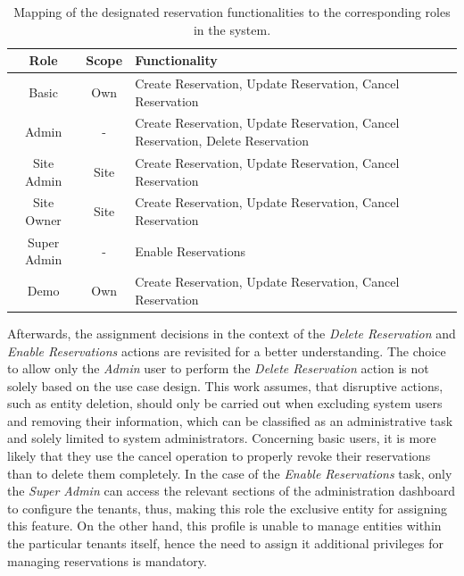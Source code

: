 \begingroup
\setlength{\tabcolsep}{10pt} %
\renewcommand{\arraystretch}{1.5} %
\begin{table}[h]
    \centering
    \caption{Mapping of the designated reservation functionalities to the corresponding roles in the system.}
    \begin{tabular}{c|c|m{9.5cm}}
        Role & Scope & Functionality \\
        \hline
        Basic & Own & Create Reservation, Update Reservation, Cancel Reservation \\
        Admin & - & Create Reservation, Update Reservation, Cancel Reservation, Delete Reservation \\
        Site Admin & Site & Create Reservation, Update Reservation, Cancel Reservation \\
        Site Owner & Site & Create Reservation, Update Reservation, Cancel Reservation \\
        Super Admin & - & Enable Reservations \\
        Demo & Own & Create Reservation, Update Reservation, Cancel Reservation \\
    \end{tabular}
    \label{tab:role-function-mapping}
\end{table}
\endgroup

\noindent Afterwards, the assignment decisions in the context of the \textit{Delete Reservation} and \textit{Enable Reservations} actions are revisited for a better understanding. The choice to allow only the \textit{Admin} user to perform the \textit{Delete Reservation} action is not solely based on the use case design.
This work assumes, that disruptive actions, such as entity deletion, should only be carried out when excluding system users and removing their information, which can be classified as an administrative task and solely limited to system administrators.
Concerning basic users, it is more likely that they use the cancel operation to properly revoke their reservations than to delete them completely.
In the case of the \textit{Enable Reservations} task, only the \textit{Super Admin} can access the relevant sections of the administration dashboard to configure the tenants, thus, making this role the exclusive entity for assigning this feature. 
On the other hand, this profile is unable to manage entities within the particular tenants itself, hence the need to assign it additional privileges for managing reservations is mandatory. 

